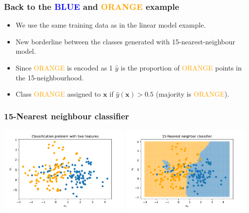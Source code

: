 \documentclass[notes]{beamer}          %
\newcommand{\vect}[1]{\bm{#1}}
\begin{document}
\begin{frame}
\frametitle{Back to the \textcolor{blue}{BLUE} and \textcolor{orange}{ORANGE} example}
    \begin{itemize}
        \item We use the same training data as in the linear model example.
        \item New borderline between the classes generated with 15-nearest-neighbour model.
        \item Since \textcolor{orange}{ORANGE} is encoded as 1 $\hat{y}$ is the proportion of \textcolor{orange}{ORANGE} points in the 15-neighbourhood.
        \item Class \textcolor{orange}{ORANGE} assigned to $\vect{x}$ if $\hat{y}(\vect{x}) > 0.5$ (majority is \textcolor{orange}{ORANGE}).
    \end{itemize}
\end{frame}

\begin{frame}
\frametitle{15-Nearest neighbour classifier}
    \begin{center}
        \includegraphics[width=0.48\textwidth]{../figures/week_1/classification_problem.pdf}
        \hfill
        \includegraphics[width=0.48\textwidth]{../figures/week_1/15-nn.pdf}
    \end{center}
\end{frame}
\end{document}
